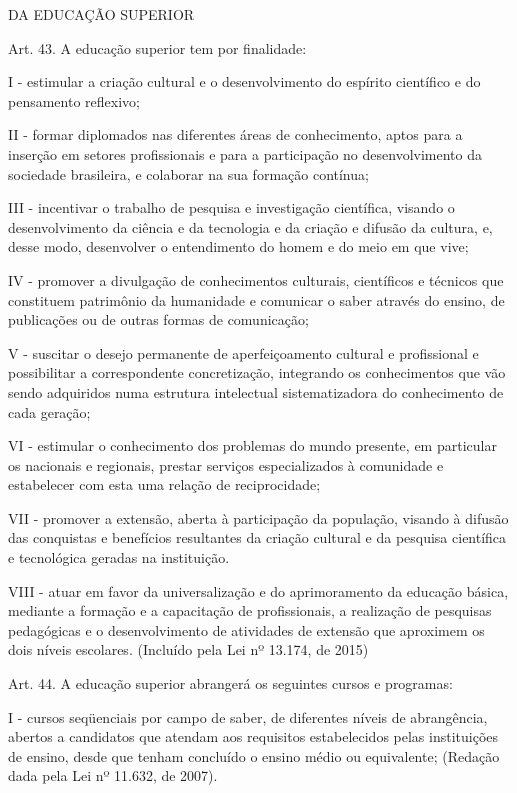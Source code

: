 \documentclass[
]{book}
\begin{document}
DA EDUCAÇÃO SUPERIOR

Art. 43. A educação superior tem por finalidade:

I - estimular a criação cultural e o desenvolvimento do espírito científico e do pensamento reflexivo;

II - formar diplomados nas diferentes áreas de conhecimento, aptos para a inserção em setores profissionais e para a participação no desenvolvimento da sociedade brasileira, e colaborar na sua formação contínua;

III - incentivar o trabalho de pesquisa e investigação científica, visando o desenvolvimento da ciência e da tecnologia e da criação e difusão da cultura, e, desse modo, desenvolver o entendimento do homem e do meio em que vive;

IV - promover a divulgação de conhecimentos culturais, científicos e técnicos que constituem patrimônio da humanidade e comunicar o saber através do ensino, de publicações ou de outras formas de comunicação;

V - suscitar o desejo permanente de aperfeiçoamento cultural e profissional e possibilitar a correspondente concretização, integrando os conhecimentos que vão sendo adquiridos numa estrutura intelectual sistematizadora do conhecimento de cada geração;

VI - estimular o conhecimento dos problemas do mundo presente, em particular os nacionais e regionais, prestar serviços especializados à comunidade e estabelecer com esta uma relação de reciprocidade;

VII - promover a extensão, aberta à participação da população, visando à difusão das conquistas e benefícios resultantes da criação cultural e da pesquisa científica e tecnológica geradas na instituição.

VIII - atuar em favor da universalização e do aprimoramento da educação básica, mediante a formação e a capacitação de profissionais, a realização de pesquisas pedagógicas e o desenvolvimento de atividades de extensão que aproximem os dois níveis escolares. (Incluído pela Lei nº 13.174, de 2015)

Art. 44. A educação superior abrangerá os seguintes cursos e programas:

I - cursos seqüenciais por campo de saber, de diferentes níveis de abrangência, abertos a candidatos que atendam aos requisitos estabelecidos pelas instituições de ensino, desde que tenham concluído o ensino médio ou equivalente; (Redação dada pela Lei nº 11.632, de 2007).
\end{document}
